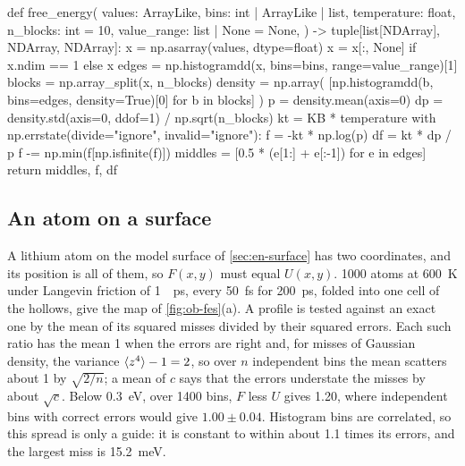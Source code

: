 \begin{code}
def free_energy(
    values: ArrayLike,
    bins: int | ArrayLike | list,
    temperature: float,
    n_blocks: int = 10,
    value_range: list | None = None,
) -> tuple[list[NDArray], NDArray, NDArray]:
    x = np.asarray(values, dtype=float)
    x = x[:, None] if x.ndim == 1 else x
    edges = np.histogramdd(x, bins=bins, range=value_range)[1]
    blocks = np.array_split(x, n_blocks)
    density = np.array(
        [np.histogramdd(b, bins=edges, density=True)[0] for b in blocks]
    )
    p = density.mean(axis=0)
    dp = density.std(axis=0, ddof=1) / np.sqrt(n_blocks)
    kt = KB * temperature
    with np.errstate(divide="ignore", invalid="ignore"):
        f = -kt * np.log(p)
        df = kt * dp / p
    f -= np.min(f[np.isfinite(f)])
    middles = [0.5 * (e[1:] + e[:-1]) for e in edges]
    return middles, f, df
\end{code}

\subsection*{An atom on a surface}

A lithium atom on the model surface of \cref{sec:en-surface} has two
coordinates, and its position is all of them, so $F(x, y)$ must equal
$U(x, y)$. 1000 atoms at \SI{600}{\kelvin} under Langevin friction of
\SI{1}{\per\pico\second}, every \SI{50}{\femto\second} for
\SI{200}{\pico\second}, folded into one cell of the hollows, give the map
of \cref{fig:ob-fes}(a). A profile is tested against an exact one by the
mean of its squared misses divided by their squared errors. Each such
ratio has the mean 1 when the errors are right and, for misses of
Gaussian density, the variance $\langle z^4 \rangle - 1 = 2$, so over $n$ independent bins the
mean scatters about 1 by $\sqrt{2/n}$; a mean of $c$ says that the
errors understate the misses by about $\sqrt c$. Below
\SI{0.3}{\electronvolt}, over 1400 bins, $F$ less $U$ gives 1.20, where
independent bins with correct errors would give $1.00 \pm 0.04$.
Histogram bins are correlated, so this spread is only a guide: it is constant to within about
1.1 times its errors, and the largest miss is
\SI{15.2}{\milli\electronvolt}.

